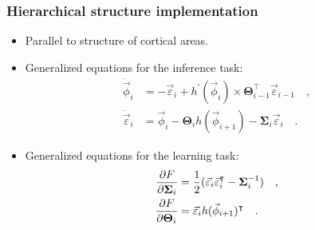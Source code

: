 \documentclass[aspectratio=43]{beamer}
\newcommand{\transpose}{\intercal}
\begin{document}
\begin{frame}
  \frametitle{Hierarchical structure implementation}
  \begin{itemize}
    \item<1-> Parallel to structure of cortical areas.
    \item<2-> Generalized equations for the inference task:
      \begin{align}
        \label{eq:dynamical_system_phi}
        \dot{\vec{\phi}}_i & = - \vec{\varepsilon}_i + h^\prime(\vec{\phi}_i) \times \boldsymbol{\Theta}_{i-1}^\transpose \vec{\varepsilon}_{i-1}
        \quad , \\
        \label{eq:dynamical_system_epsilon}
        \dot{\vec{\varepsilon}}_i & = \vec{\phi}_i - \boldsymbol{\Theta}_i h(\vec{\phi}_{i+1}) - \boldsymbol{\Sigma}_i \vec{\varepsilon}_i
        \quad .
      \end{align}
    \item<2-> Generalized equations for the learning task:
      \begin{align}
        \label{eq:dynamical_system_sigma}
        \pdv{F}{\boldsymbol{\Sigma}_i} & = \frac{1}{2} (\vec{\varepsilon}_i \vec{\varepsilon}_i^\transpose - \boldsymbol{\Sigma}_i^{-1})
        \quad , \\
        \label{eq:dynamical_system_theta}
        \pdv{F}{\boldsymbol{\Theta}_i} & = \vec{\varepsilon}_i h(\vec{\phi}_{i+1})^\transpose
        \quad .
      \end{align}
  \end{itemize}
\end{frame}
\end{document}
